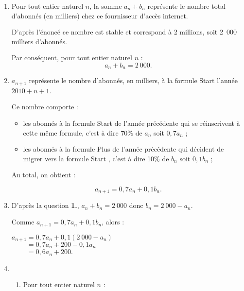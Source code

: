 \begin{corrige}
     \begin{enumerate}
          \item %
          Pour tout entier naturel $n$, la somme ${a_n+b_n}$ représente le nombre total d'abonnés (en milliers) chez ce fournisseur d'accès internet.
          \par
          D'après l'énoncé ce nombre est stable et correspond à 2 millions, soit 2~000 milliers d'abonnés.
          \par
          Par conséquent, pour tout entier naturel $n$ :
          \[ a_n+b_n = 2~000. \]
          \item %
          $a_{n+1}$ représente le nombre d'abonnés, en milliers, à la formule \og Start \fg{} l'année $2010+n+1$.
          \par
          Ce nombre comporte :
          \par
          \begin{itemize}
               \item
               les abonnés à la formule \og Start \fg{} de l'année précédente qui se réinscrivent à cette même formule, c'est à dire 70\% de $a_n$ soit $0,7a_n$ ;
               \item
               les abonnés à la formule \og Plus \fg{} de l'année précédente qui décident de migrer vers la formule \og Start  \fg{}, c'est à dire 10\% de $b_n$ soit $0,1b_n$ ;
               \par
          \end{itemize}
          \par
          Au total, on obtient :
          \par
          \[ a_{n+1} =0,7a_n+0,1b_n. \]
          \item %
          D'après la question \textbf{1.}, $a_n+b_n = 2~000$ donc $b_n = 2~000 - a_n$.
          \par
          Comme $a_{n+1} =0,7a_n+0,1b_n$, alors :
          \par
          $a_{n+1} =0,7a_n+0,1(2~000 - a_n)$\\
          $\phantom{a_{n+1}} =0,7a_n+200 - 0,1a_n$\\
          $\phantom{a_{n+1}} =0,6a_n+200.$
          \item %
          \begin{enumerate}[label=\alph*.]
               \item %
               Pour tout entier naturel $n$ :
               \par

\end{enumerate}
\end{enumerate}
\end{corrige}
